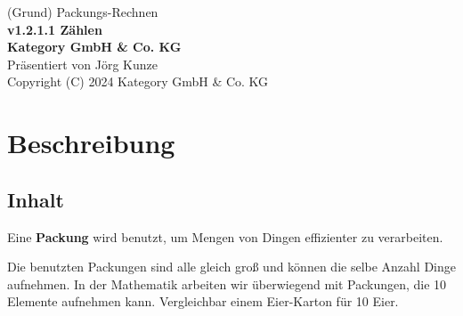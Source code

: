\documentclass[a4paper]{amsart}
\theoremstyle{definition}
\begin{document}
\begin{titlepage}
\centering
{\huge
(Grund) Packungs-Rechnen\\[1cm]
\textbf{v1.2.1.1 Zählen}
}\\[1cm]

\textbf{Kategory GmbH \& Co. KG}\\
Präsentiert von Jörg Kunze\\
Copyright (C) 2024 Kategory GmbH \& Co. KG

\end{titlepage}

%

\newpage

\section*{Beschreibung}

\subsection*{Inhalt}
Eine \textbf{Packung} wird benutzt, um Mengen von Dingen effizienter zu verarbeiten.

Die benutzten Packungen sind alle gleich groß und können die selbe Anzahl Dinge aufnehmen. In der Mathematik arbeiten wir überwiegend mit Packungen, die 10 Elemente aufnehmen kann. Vergleichbar einem Eier-Karton für 10 Eier.
\end{document}
